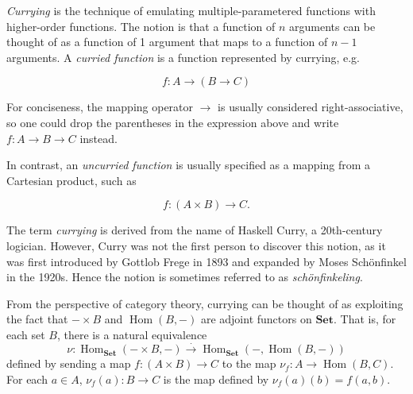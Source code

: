 \documentclass[12pt]{article}
\DeclareMathOperator{\Hom}{Hom}
\newcommand{\Set}{\mathbf{Set}}
\begin{document}
\emph{Currying} is the technique of emulating multiple-parametered
functions with higher-order functions.  The notion is that a function
of $n$ arguments can be thought of as a function of 1 argument that
maps to a function of $n-1$ arguments.  A \emph{curried function} is a
function represented by currying, e.g.

\[
f \colon A \to (B\to C)
\]

For conciseness, the mapping operator $\rightarrow$ is usually
considered right-associative, so one could drop the parentheses in the
expression above and write $f \colon A\to B\to C$ instead.

In contrast, an \emph{uncurried function} is usually specified as a
mapping from a Cartesian product, such as

\[
f \colon (A\times B)\to C.
\]

The term \emph{currying} is derived from the name of Haskell Curry, a
20th-century logician.  However, Curry was not the first person to
discover this notion, as it was first introduced by Gottlob Frege in
1893 and expanded by Moses Sch\"onfinkel in the 1920s.  Hence the
notion is sometimes referred to as \emph{sch\"onfinkeling}.


From the perspective of category theory, currying can be thought of as
exploiting the fact that $-\times B$ and $\Hom(B,-)$ are adjoint
functors on $\Set$.  That is, for each set $B$, there is a natural
equivalence
\[
   \nu\colon \Hom_{\Set}(-\times B,-)\overset{\cdot}{\longrightarrow}\Hom_{\Set}(-,\Hom(B,-))
\]
defined by sending a map $f\colon (A\times B)\to C$ to the map
$\nu_f\colon A\to \Hom(B, C)$.  For each $a\in A$, $\nu_f(a)\colon
B\to C$ is the map defined by $\nu_f(a)(b) = f(a,b)$.

\end{document}
